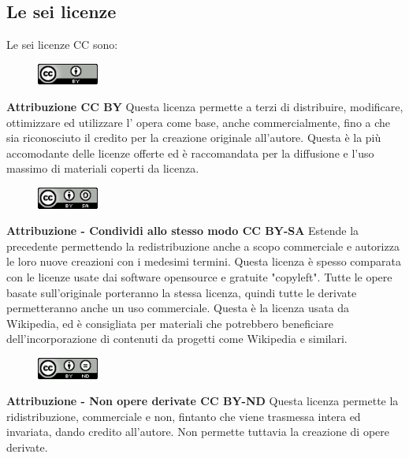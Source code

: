\subsection{Le sei licenze}
Le sei licenze CC sono:

\begin{figure}
    \includegraphics[width=20mm]{images/cc_by}
\end{figure}

\noindent \textbf{Attribuzione CC BY} Questa licenza permette a terzi di distribuire, modificare, ottimizzare ed utilizzare l' opera come base, anche commercialmente, fino a che sia riconosciuto il credito per la creazione originale all'autore. Questa è la più accomodante delle licenze offerte ed è raccomandata per la diffusione e l'uso massimo di materiali coperti da licenza.\\
\begin{figure}
    \includegraphics[width=20mm]{images/cc_by_sa}
\end{figure}

\noindent \textbf{Attribuzione - Condividi allo stesso modo CC BY-SA} Estende la precedente permettendo la redistribuzione anche a scopo commerciale e autorizza le loro nuove creazioni con i medesimi termini. Questa licenza è spesso comparata con le licenze usate dai software opensource e gratuite "copyleft". Tutte le opere basate sull'originale porteranno la stessa licenza, quindi tutte le derivate permetteranno anche un uso commerciale. Questa è la licenza usata da Wikipedia, ed è consigliata per materiali che potrebbero beneficiare dell'incorporazione di contenuti da progetti come Wikipedia e similari.\\

\begin{figure}
    \includegraphics[width=20mm]{images/cc_by_nd}
\end{figure}

\noindent \textbf{Attribuzione - Non opere derivate CC BY-ND} Questa licenza permette la ridistribuzione, commerciale e non, fintanto che viene trasmessa intera ed invariata, dando credito all'autore. Non permette tuttavia la creazione di opere derivate.\\

